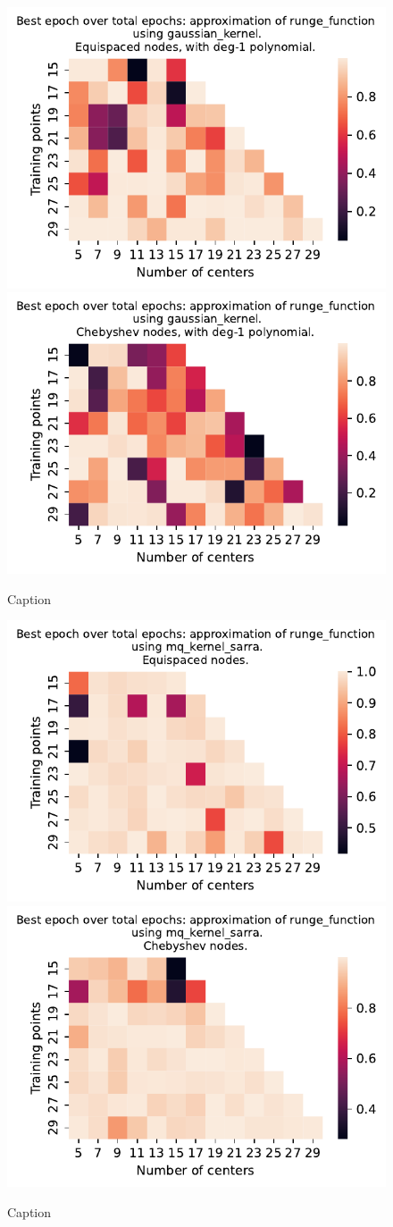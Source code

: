 \documentclass[12pt]{report} %
\begin{document}
\begin{figure}[ht]
    \centering
    
    \includegraphics[width=.49\textwidth]{imagenes/experiments/1d/variational_epochs/runge_function-Kgaussian_kernel-Poly-Equi-epochs.pdf}
    \includegraphics[width=.49\textwidth]{imagenes/experiments/1d/variational_epochs/runge_function-Kgaussian_kernel-Poly-Cheb-epochs.pdf}
    \caption{Caption}
    \label{fig:epochs-runge-gaussian-poly}
\end{figure}

\begin{figure}[ht]
    \centering
    
    \includegraphics[width=.49\textwidth]{imagenes/experiments/1d/variational_epochs/runge_function-Kmq_kernel_sarra-Equi-epochs.pdf}
    \includegraphics[width=.49\textwidth]{imagenes/experiments/1d/variational_epochs/runge_function-Kmq_kernel_sarra-Cheb-epochs.pdf}
    \caption{Caption}
    \label{fig:epochs-runge-sarra}
\end{figure}
\end{document}
